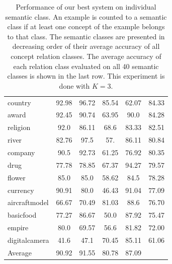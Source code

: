 \begin{table}[h]
\begin{center}
\begin{tabular}{l|c|c|c|c||c}
      country           &             92.98  &              96.72  &                  85.54  &                   62.07  &    84.33  \\
      award             &             92.45  &              90.74  &                  63.95  &                    90.0  &    84.28  \\
      religion          &              92.0  &              86.11  &                   68.6  &                   83.33  &    82.51  \\
      river             &             82.76  &               97.5  &                    57.  &                   86.11  &    80.84  \\
      company           &              90.5  &              92.73  &                  61.25  &                   76.92  &    80.35  \\
      drug              &             77.78  &              78.85  &                  67.37  &                   94.27  &    79.57  \\
      flower            &              85.0  &               85.0  &                  58.62  &                    84.5  &    78.28  \\
      currency          &             90.91  &               80.0  &                  46.43  &                   91.04  &    77.09  \\
      aircraftmodel     &             66.67  &              70.49  &                  81.03  &                    88.6  &    76.70  \\
      basicfood         &             77.27  &              86.67  &                   50.0  &                   87.92  &    75.47  \\
      empire            &              80.0  &              69.57  &                   56.6  &                   81.82  &    72.00  \\
      digitalcamera     &              41.6  &               47.1  &                  70.45  &                   85.11  &    61.06  \\
      \hline
      Average           &             90.92  &              91.55  &                  80.78  &                   87.09  &           \\
      \hline
    \end{tabular}
    \caption{Performance of our best system on individual semantic
      class. An example is counted to a semantic class if at least one
      concept of the example belongs to that class. The semantic
      classes are presented in decreasing order of their average
      accuracy of all concept relation classes. The average accuracy
      of each relation class evaluated on all 40 semantic classes is
      shown in the last row. This experiment is done with $K=3$.}
    \label{tab:exp-ind-class}
  \end{center}
\end{table}

